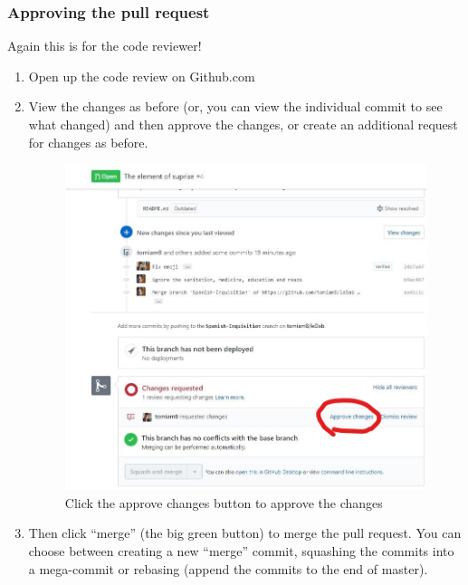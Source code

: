 \documentclass[11pt, titlepage]{article}
\begin{document}
\subsubsection{Approving the pull request}
\label{BPRW_RPW_approving_pull_request}
Again this is for the code reviewer!
\begin{enumerate}
	\item Open up the code review on Github.com
	\item View the changes as before (or, you can view the individual commit to see what changed) and then approve the changes, or create an additional request for changes as before.
	\begin{figure}[H]
		\centering
		\includegraphics[width=\textwidth]{BPRW/9approve-changes}
		\caption{Click the approve changes button to approve the changes}
	\end{figure}
	\item Then click ``merge'' (the big green button) to merge the pull request. You can choose between creating a new ``merge'' commit, squashing the commits into a mega-commit or rebasing (append the commits to the end of master).
\end{enumerate}
\end{document}
